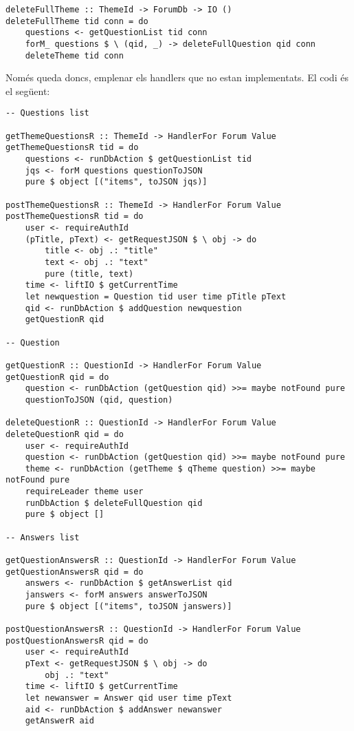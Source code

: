 \documentclass[catalan, a4paper]{scrartcl}
\begin{document}
\begin{verbatim}
deleteFullTheme :: ThemeId -> ForumDb -> IO ()
deleteFullTheme tid conn = do
    questions <- getQuestionList tid conn
    forM_ questions $ \ (qid, _) -> deleteFullQuestion qid conn
    deleteTheme tid conn
\end{verbatim}

Només queda doncs, emplenar els handlers que no estan implementats.
El codi és el següent:

\begin{verbatim}
-- Questions list

getThemeQuestionsR :: ThemeId -> HandlerFor Forum Value
getThemeQuestionsR tid = do
    questions <- runDbAction $ getQuestionList tid
    jqs <- forM questions questionToJSON
    pure $ object [("items", toJSON jqs)]

postThemeQuestionsR :: ThemeId -> HandlerFor Forum Value
postThemeQuestionsR tid = do
    user <- requireAuthId
    (pTitle, pText) <- getRequestJSON $ \ obj -> do
        title <- obj .: "title"
        text <- obj .: "text"
        pure (title, text)
    time <- liftIO $ getCurrentTime
    let newquestion = Question tid user time pTitle pText
    qid <- runDbAction $ addQuestion newquestion
    getQuestionR qid

-- Question

getQuestionR :: QuestionId -> HandlerFor Forum Value
getQuestionR qid = do
    question <- runDbAction (getQuestion qid) >>= maybe notFound pure
    questionToJSON (qid, question)

deleteQuestionR :: QuestionId -> HandlerFor Forum Value
deleteQuestionR qid = do
    user <- requireAuthId
    question <- runDbAction (getQuestion qid) >>= maybe notFound pure
    theme <- runDbAction (getTheme $ qTheme question) >>= maybe notFound pure
    requireLeader theme user
    runDbAction $ deleteFullQuestion qid
    pure $ object []

-- Answers list

getQuestionAnswersR :: QuestionId -> HandlerFor Forum Value
getQuestionAnswersR qid = do
    answers <- runDbAction $ getAnswerList qid
    janswers <- forM answers answerToJSON
    pure $ object [("items", toJSON janswers)]

postQuestionAnswersR :: QuestionId -> HandlerFor Forum Value
postQuestionAnswersR qid = do
    user <- requireAuthId
    pText <- getRequestJSON $ \ obj -> do
        obj .: "text"
    time <- liftIO $ getCurrentTime
    let newanswer = Answer qid user time pText
    aid <- runDbAction $ addAnswer newanswer
    getAnswerR aid


\end{verbatim}
\end{document}

